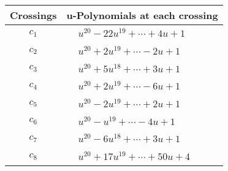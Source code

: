 \documentclass[1p]{elsarticle_modified}
\theoremstyle{definition}
\begin{document}
\begin{tabular}{m{50pt}|m{274pt}}
Crossings & \hspace{64pt}u-Polynomials at each crossing \\
\hline $$\begin{aligned}c_{1}\end{aligned}$$&$\begin{aligned}
&u^{20}-22 u^{19}+\cdots+4 u+1
\end{aligned}$\\
\hline $$\begin{aligned}c_{2}\end{aligned}$$&$\begin{aligned}
&u^{20}+2 u^{19}+\cdots-2 u+1
\end{aligned}$\\
\hline $$\begin{aligned}c_{3}\end{aligned}$$&$\begin{aligned}
&u^{20}+5 u^{18}+\cdots+3 u+1
\end{aligned}$\\
\hline $$\begin{aligned}c_{4}\end{aligned}$$&$\begin{aligned}
&u^{20}+2 u^{19}+\cdots-6 u+1
\end{aligned}$\\
\hline $$\begin{aligned}c_{5}\end{aligned}$$&$\begin{aligned}
&u^{20}-2 u^{19}+\cdots+2 u+1
\end{aligned}$\\
\hline $$\begin{aligned}c_{6}\end{aligned}$$&$\begin{aligned}
&u^{20}- u^{19}+\cdots-4 u+1
\end{aligned}$\\
\hline $$\begin{aligned}c_{7}\end{aligned}$$&$\begin{aligned}
&u^{20}-6 u^{18}+\cdots+3 u+1
\end{aligned}$\\
\hline $$\begin{aligned}c_{8}\end{aligned}$$&$\begin{aligned}
&u^{20}+17 u^{19}+\cdots+50 u+4
\end{aligned}$\\

\end{tabular}
\end{document}
